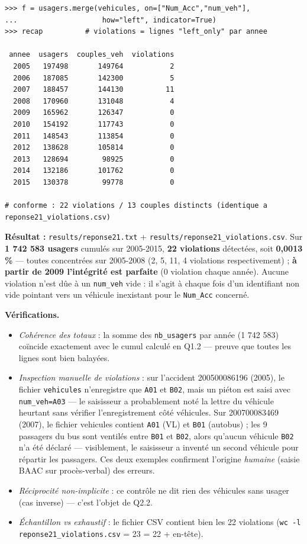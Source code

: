 \documentclass[11pt,a4paper]{article}
\newcommand{\rub}[2]{\textbf{\textcolor{#1}{#2}}}
\begin{document}
\begin{lstlisting}[style=pyblock]
>>> f = usagers.merge(vehicules, on=["Num_Acc","num_veh"],
...                    how="left", indicator=True)
>>> recap          # violations = lignes "left_only" par annee

 annee  usagers  couples_veh  violations
  2005   197498       149764           2
  2006   187085       142300           5
  2007   188457       144130          11
  2008   170960       131048           4
  2009   165962       126347           0
  2010   154192       117743           0
  2011   148543       113854           0
  2012   138628       105814           0
  2013   128694        98925           0
  2014   132186       101762           0
  2015   130378        99778           0

# conforme : 22 violations / 13 couples distincts (identique a reponse21_violations.csv)
\end{lstlisting}

\rub{labresultat}{Résultat :} \texttt{results/reponse21.txt} + \texttt{results/reponse21\_violations.csv}. Sur \textbf{1 742 583 usagers} cumulés sur 2005-2015, \textbf{22 violations} détectées, soit \textbf{0,0013 \%} — toutes concentrées sur 2005-2008 (2, 5, 11, 4 violations respectivement) ; \textbf{à partir de 2009 l'intégrité est parfaite} (0 violation chaque année). Aucune violation n'est dûe à un \texttt{num\_veh} vide : il s'agit à chaque fois d'un identifiant non vide pointant vers un véhicule inexistant pour le \texttt{Num\_Acc} concerné.

\rub{labanalyse}{Vérifications.}

\begin{itemize}
\item \emph{Cohérence des totaux} : la somme des \texttt{nb\_usagers} par année (1 742 583) coïncide exactement avec le cumul calculé en Q1.2 — preuve que toutes les lignes sont bien balayées.
\item \emph{Inspection manuelle de violations} : sur l'accident 200500086196 (2005), le fichier \texttt{vehicules} n'enregistre que \texttt{A01} et \texttt{B02}, mais un piéton est saisi avec \texttt{num\_veh=A03} — le saisisseur a probablement noté la lettre du véhicule heurtant sans vérifier l'enregistrement côté véhicules. Sur 200700083469 (2007), le fichier vehicules contient \texttt{A01} (VL) et \texttt{B01} (autobus) ; les 9 passagers du bus sont ventilés entre \texttt{B01} et \texttt{B02}, alors qu'aucun véhicule \texttt{B02} n'a été déclaré — visiblement, le saisisseur a inventé un second véhicule pour répartir les passagers. Ces deux exemples confirment l'origine \emph{humaine} (saisie BAAC sur procès-verbal) des erreurs.
\item \emph{Réciprocité non-implicite} : ce contrôle ne dit rien des véhicules sans usager (cas inverse) — c'est l'objet de Q2.2.
\item \emph{Échantillon vs exhaustif} : le fichier CSV contient bien les 22 violations (\texttt{wc -l reponse21\_violations.csv} = 23 = 22 + en-tête).
\end{itemize}
\end{document}
